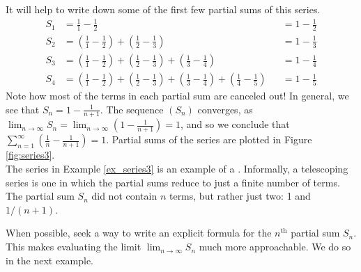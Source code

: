 \documentclass{ximera}
\begin{document}
{It will help to write down some of the first few partial sums of this series.
\begin{align*}
S_1 &=	\frac11-\frac12 & & = 1-\frac12\\
S_2 &=	\left(\frac11-\frac12\right) + \left(\frac12-\frac13\right) & & = 1-\frac13\\
S_3 &=	\left(\frac11-\frac12\right) + \left(\frac12-\frac13\right)+\left(\frac13-\frac14\right) & &= 1-\frac14\\
S_4 &=	\left(\frac11-\frac12\right) + \left(\frac12-\frac13\right)+\left(\frac13-\frac14\right) +\left(\frac14-\frac15\right)& &= 1-\frac15
\end{align*}
Note how most of the terms in each partial sum are canceled out! In general, we see that $S_n = 1-\frac{1}{n+1}$. The sequence $(S_n)$ converges,  as $\lim_{n\to\infty}S_n = \lim_{n\to\infty}\left(1-\frac1{n+1}\right) = 1$, and so we conclude that $\sum_{n=1}^\infty \left(\frac1n-\frac1{n+1}\right) = 1$. Partial sums of the series are plotted in Figure \ref{fig:series3}.
}\\

The series in Example \ref{ex_series3} is an example of a . Informally, a telescoping series is one in which the partial sums reduce to just a finite number of terms. The partial sum $S_n$ did not contain $n$ terms, but rather just two: 1 and $1/(n+1)$.

When possible, seek a way to write an explicit formula for the $n^\text{th}$ partial sum $S_n$. This makes evaluating the limit $\lim_{n\to\infty} S_n$ much more approachable. We do so in the next example.\\

\end{document}
